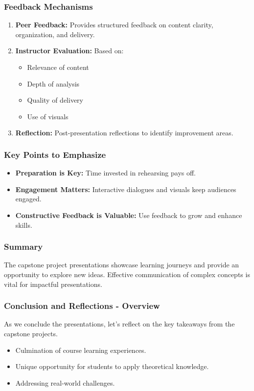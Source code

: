 \documentclass[aspectratio=169]{beamer}
\begin{document}
\begin{frame}[fragile]
    \frametitle{Feedback Mechanisms}
    \begin{enumerate}
        \item \textbf{Peer Feedback:} Provides structured feedback on content clarity, organization, and delivery.
        \item \textbf{Instructor Evaluation:} Based on:
            \begin{itemize}
                \item Relevance of content
                \item Depth of analysis
                \item Quality of delivery
                \item Use of visuals
            \end{itemize}
        \item \textbf{Reflection:} Post-presentation reflections to identify improvement areas.
    \end{enumerate}
\end{frame}

\begin{frame}[fragile]
    \frametitle{Key Points to Emphasize}
    \begin{itemize}
        \item \textbf{Preparation is Key:} Time invested in rehearsing pays off.
        \item \textbf{Engagement Matters:} Interactive dialogues and visuals keep audiences engaged.
        \item \textbf{Constructive Feedback is Valuable:} Use feedback to grow and enhance skills.
    \end{itemize}
\end{frame}

\begin{frame}[fragile]
    \frametitle{Summary}
    The capstone project presentations showcase learning journeys and provide an opportunity to explore new ideas. Effective communication of complex concepts is vital for impactful presentations.
\end{frame}

\begin{frame}[fragile]
    \frametitle{Conclusion and Reflections - Overview}
    As we conclude the presentations, let's reflect on the key takeaways from the capstone projects. 
    \begin{itemize}
        \item Culmination of course learning experiences.
        \item Unique opportunity for students to apply theoretical knowledge.
        \item Addressing real-world challenges.
    \end{itemize}
\end{frame}
\end{document}

